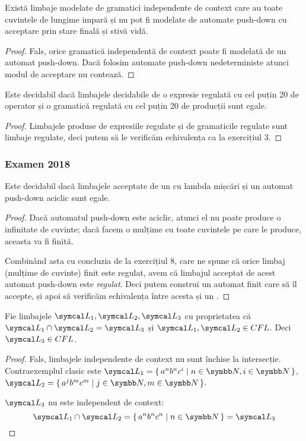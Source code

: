 \begin{exercise}
    Există limbaje modelate de gramatici independente de context care au toate cuvintele de lungime impară și nu pot fi modelate de automate push-down cu acceptare prin stare finală și stivă vidă.
\end{exercise}
\begin{proof}
    Fals, orice gramatică independentă de context poate fi modelată de un automat push-down. Dacă folosim automate push-down nedeterministe atunci modul de acceptare nu contează.
\end{proof}

\begin{exercise}
    Este decidabil dacă limbajele decidabile de o expresie regulată cu cel puțin 20 de operator și o gramatică regulată cu cel puțin 20 de producții sunt egale.
\end{exercise}
\begin{proof}
    Limbajele produse de expresiile regulate și de gramaticile regulate sunt limbaje regulate, deci putem să le verificăm echivalența ca la exercițiul 3.
\end{proof}

\subsubsection*{Examen 2018}

\begin{exercise}
    Este decidabil dacă limbajele acceptate de un \nfa{} cu lambda mișcări și un automat push-down aciclic sunt egale.
\end{exercise}
\begin{proof}
    Dacă automatul push-down este aciclic, atunci el nu poate produce o infinitate de cuvinte; dacă facem o mulțime cu toate cuvintele pe care le produce, aceasta va fi finită.

    Combinând asta cu concluzia de la exercițiul 8, care ne spune că orice limbaj (mulțime de cuvinte) finit este regulat, avem că limbajul acceptat de acest automat push-down este \emph{regulat}. Deci putem construi un automat finit care să îl accepte, și apoi să verificăm echivalența între acesta și un \nfa{}.
\end{proof}

\begin{exercise}
    Fie limbajele \(\limbaj_1, \limbaj_2, \limbaj_3\) cu proprietatea că \(\limbaj_1 \cap \limbaj_2 = \limbaj_3\) și \(\limbaj_1, \limbaj_2 \in CFL\). Deci \(\limbaj_3 \in CFL\).
\end{exercise}
\begin{proof}
    Fals, limbajele independente de context nu sunt închise la intersecție. Contraexemplul clasic este \(\limbaj_1 = \set{ a^n b^n c^i | n \in \naturals, i \in \naturals }\), \(\limbaj_2 = \set{ a^j b^m c^m | j \in \naturals, m \in \naturals }\).

    \(\limbaj_3\) nu este independent de context:
    \[\limbaj_1 \cap \limbaj_2 = \set{ a^n b^n c^n | n \in \naturals } = \limbaj_3\]
\end{proof}


